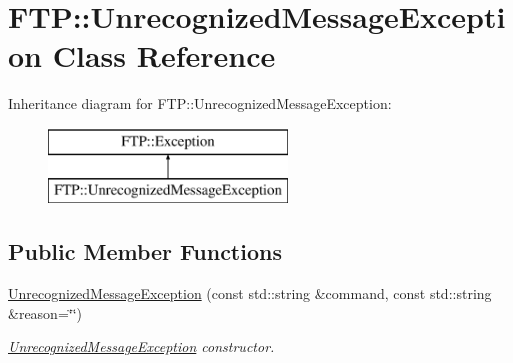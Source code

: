 \hypertarget{class_f_t_p_1_1_unrecognized_message_exception}{\section{F\-T\-P\-:\-:Unrecognized\-Message\-Exception Class Reference}
\label{class_f_t_p_1_1_unrecognized_message_exception}
}
Inheritance diagram for F\-T\-P\-:\-:Unrecognized\-Message\-Exception\-:\begin{figure}[H]
\begin{center}
\leavevmode
\includegraphics[height=2.000000cm]{class_f_t_p_1_1_unrecognized_message_exception}
\end{center}
\end{figure}
\subsection*{Public Member Functions}
\begin{DoxyCompactItemize}
\item 
\hyperlink{class_f_t_p_1_1_unrecognized_message_exception_ab4fc5bbfce2fd43536fd17ea6fc3aa4a}{Unrecognized\-Message\-Exception} (const std\-::string \&command, const std\-::string \&reason=\char`\"{}\char`\"{})
\begin{DoxyCompactList}\small\item\em \hyperlink{class_f_t_p_1_1_unrecognized_message_exception}{Unrecognized\-Message\-Exception} constructor. \end{DoxyCompactList}\end{DoxyCompactItemize}


